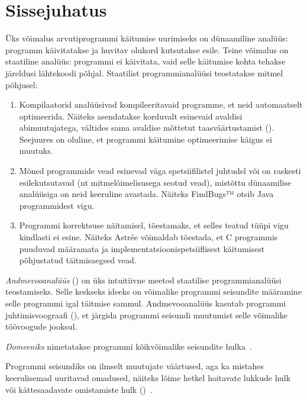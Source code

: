 \documentclass[../thesis.tex]{subfiles}
\begin{document}
\section{Sissejuhatus}

Üks võimalus arvutiprogrammi käitumise uurimiseks on dünaamiline analüüs: programm käivitatakse ja huvitav olukord kutsutakse esile. Teine võimalus on staatiline analüüs: programmi ei käivitata, vaid selle käitumise kohta tehakse järeldusi lähtekoodi põhjal. Staatilist programmianalüüsi teostatakse mitmel põhjusel:
\begin{enumerate}
	\item Kompilaatorid analüüsivad kompileeritavaid programme, et neid automaatselt optimeerida. Näiteks asendatakse korduvalt esinevaid avaldisi abimuutujatega, vältides sama avaldise mõttetut taasväärtustamist (). Seejuures on oluline, et programmi käitumine optimeerimise käigus ei muutuks. 

	\item Mõned programmide vead esinevad väga spetsiifilistel juhtudel või on raskesti esilekutsutavad (nt mitmelõimelisusega seotud vead), mistõttu dünaamilise analüüsiga on neid keeruline avastada. Näiteks FindBugs™ otsib Java programmidest vigu.

	\item Programmi korrektsuse näitamisel, tõestamaks, et selles teatud tüüpi vigu kindlasti ei esine. Näiteks Astrée võimaldab tõestada, et C programmis puuduvad määramata ja implementatsioonispetsiiflisest käitumisest põhjustatud täitmisaegsed vead.
\end{enumerate}

\emph{Andmevooanalüüs} () on üks intuitiivne meetod staatilise programmianalüüsi teostamiseks. Selle keskseks ideeks on võimalike programmi seisundite määramine selle programmi igal täitmise sammul. Andmevooanalüüs kasutab programmi juhtimisvoograafi (), et järgida programmi seisundi muutumist selle võimalike töövoogude jooksul.

\begin{definition}
\emph{Domeeniks} nimetatakse programmi kõikvõimalike seisundite hulka~\cite{vojdani_magister}.
\end{definition}

Programmi seisundiks on ilmselt muutujate väärtused, aga ka mistahes keerulisemad uuritavad omadused, näiteks lõime hetkel hoitavate lukkude hulk~\cite{vojdani_magister} või kättesaadavate omistamiste hulk ()~\cite[12]{seidl_foundations}.
\end{document}
